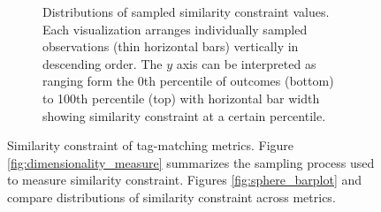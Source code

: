 \begin{figure}
\begin{center}
\begin{minipage}{\linewidth}
\begin{subfigure}[b]{\linewidth}
\begin{minipage}{0.8\textwidth}
\caption{
Distributions of sampled similarity constraint values.
Each visualization arranges individually sampled observations (thin horizontal bars) vertically in descending order.
The $y$ axis can be interpreted as ranging form the 0th percentile of outcomes (bottom) to 100th percentile (top) with horizontal bar width showing similarity constraint at a certain percentile.
}
\label{fig:sphere_distnplot}
\end{minipage}
\end{subfigure}
\end{minipage}

\caption{
Similarity constraint of tag-matching metrics.
Figure \ref{fig:dimensionality_measure} summarizes the sampling process used to measure similarity constraint.
Figures \ref{fig:sphere_barplot} and  \label{fig:sphere_distnplot} compare distributions of similarity constraint across metrics.
}
\label{fig:sphere}

\end{center}
\end{figure}
